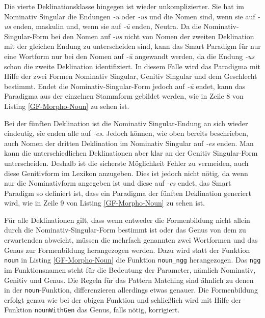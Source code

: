 Die vierte Deklinationsklasse hingegen ist wieder unkomplizierter. Sie hat im Nominativ Singular die Endungen \textit{-ū} oder \textit{-us} und die Nomen sind, wenn sie auf \textit{-us} enden, maskulin und, wenn sie auf \textit{-ū} enden, Neutra. Da die Nominativ-Singular-Form bei den Nomen auf \textit{-us} nicht von Nomen der zweiten Deklination mit der gleichen Endung zu unterscheiden sind, kann das Smart Paradigm für nur eine Wortform nur bei den Nomen auf \textit{-ū} angewandt werden, da die Endung \textit{-us} schon die zweite Deklination identifiziert. In diesem Falle wird das Paradigma mit Hilfe der zwei Formen Nominativ Singular, Genitiv Singular und dem Geschlecht bestimmt. Endet die Nominativ-Singular-Form jedoch auf \textit{-ū} endet, kann das Paradigma aus der einzelnen Stammform gebildet werden, wie in Zeile 8 von Listing \ref{GF-Morpho-Noun} zu sehen ist. \par
Bei der fünften Deklination ist die Nominativ Singular-Endung an sich wieder eindeutig, sie enden alle auf \textit{-es}. Jedoch können, wie oben bereits beschrieben, auch Nomen der dritten Deklination im Nominativ Singular auf \textit{-es} enden. Man kann die unterschiedlichen Deklinationen aber klar an der Genitiv Singular-Form unterscheiden. Deshalb ist die sicherste Möglichkeit Fehler zu vermeiden, auch diese Genitivform im Lexikon anzugeben. Dies ist jedoch nicht nötig, da wenn nur die Nominativform angegeben ist und diese auf \textit{-es} endet, das Smart Paradigm so definiert ist, dass ein Paradigma der fünften Deklination generiert wird, wie in Zeile 9 von Listing \ref{GF-Morpho-Noun} zu sehen ist. \par
Für alle Deklinationen gilt, dass wenn entweder die Formenbildung nicht allein durch die Nominativ-Singular-Form bestimmt ist oder das Genus von dem zu erwartenden abweicht, müssen die mehrfach genannten zwei Wortformen und das Genus zur Formenbildung herangezogen werden. Dazu wird statt der Funktion \texttt{noun} in Listing \ref{GF-Morpho-Noun} die Funktion \texttt{noun\_ngg} herangezogen. Das \texttt{ngg} im Funktionsnamen steht für die Bedeutung der Parameter, nämlich Nominativ, Genitiv und Genus. Die Regeln für das Pattern Matching sind ähnlich zu denen in der \texttt{noun}-Funktion, differenzieren allerdings etwas genauer. Die Formenbildung erfolgt genau wie bei der obigen Funktion und schließlich wird mit Hilfe der Funktion \texttt{nounWithGen} das Genus, falls nötig, korrigiert.
